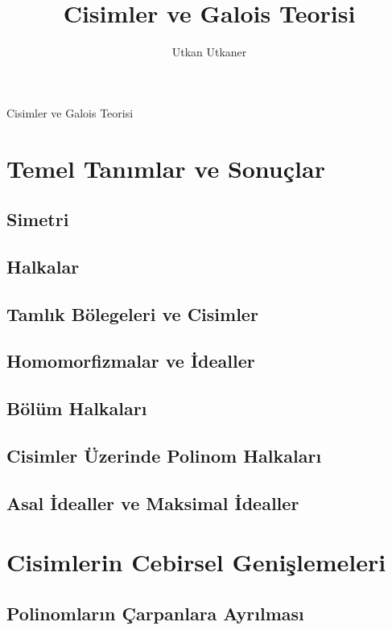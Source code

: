 \documentclass[draft]{article}
\title{Cisimler ve Galois Teorisi}
\author{Utkan Utkaner}
\theoremstyle{definition}
\theoremstyle{remark}
\begin{document}
	\maketitle
	{Cisimler ve Galois Teorisi}
	\renewcommand{\sectionmark}[1]{}
	
	\section{Temel Tanımlar ve Sonuçlar}
		
        \subsection{Simetri}
		
        \subsection{Halkalar}
		
        \subsection{Tamlık Bölegeleri ve Cisimler}
		
        \subsection{Homomorfizmalar ve İdealler}
		
        \subsection{Bölüm Halkaları}
		
        \subsection{Cisimler Üzerinde Polinom Halkaları}
		
        \subsection{Asal İdealler ve Maksimal İdealler}
		    
	\section{Cisimlerin Cebirsel Genişlemeleri}
	
		\subsection{Polinomların Çarpanlara Ayrılması}
		
\end{document}
